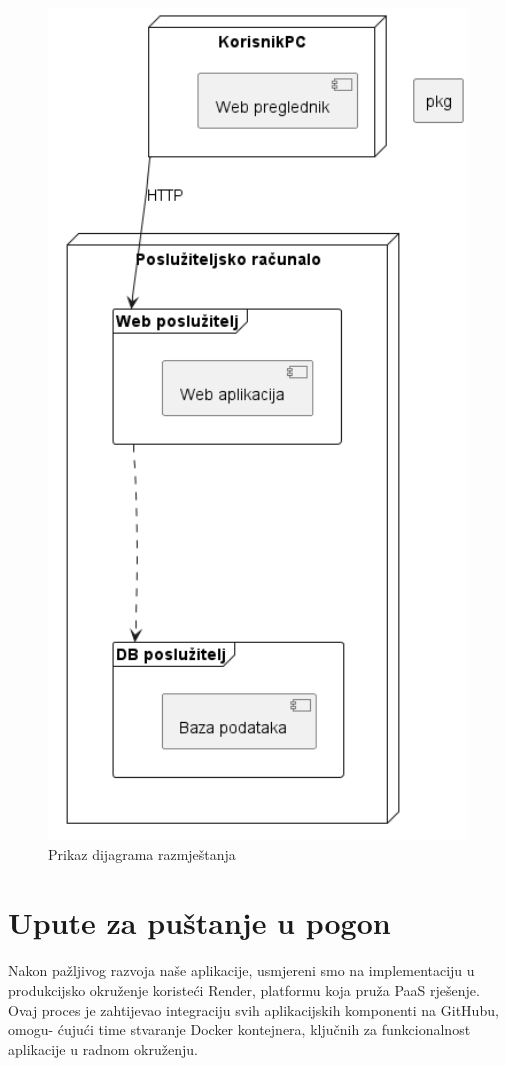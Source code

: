 		\begin{figure} [H]
			\centering
			\includegraphics[width=0.7\linewidth]{dijagrami/dijagramRazmjestanja.png}
			\caption{Prikaz dijagrama razmještanja}
			\label{fig:Prikaz dijagrama razmještanja}
		\end{figure}

			\eject 
		
		\section{Upute za puštanje u pogon}


		Nakon pažljivog razvoja naše aplikacije, usmjereni smo na implementaciju u produkcijsko okruženje koristeći Render, platformu koja pruža PaaS rješenje. Ovaj proces je zahtijevao integraciju svih aplikacijskih komponenti na GitHubu, omogu- ćujući time stvaranje Docker kontejnera, ključnih za funkcionalnost aplikacije u radnom okruženju.

